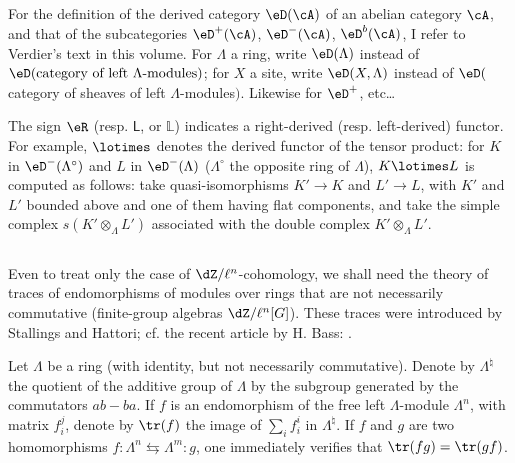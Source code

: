 \subsection{}\label{II:4-1}

For the definition of the derived category $\eD(\cA)$ of an abelian category
$\cA$, and that of the subcategories $\eD^+(\cA)$, $\eD^-(\cA)$,
$\eD^b(\cA)$, I refer to Verdier's text in this volume. For $\Lambda$ a ring,
write $\eD(\Lambda)$ instead of
$\eD(\text{category of left $\Lambda$-modules})$; for $X$ a site, write
$\eD(X,\Lambda)$ instead of
$\eD($category of sheaves of left $\Lambda$-modules$)$. Likewise for
$\eD^+$, etc\ldots

The sign $\eR$ (resp. $\mathsf{L}$, or $\mathbb{L}$) indicates a right-derived (resp.
left-derived) functor. For example, $\lotimes$ denotes the derived functor of
the tensor product: for $K$ in $\eD^-(\Lambda^\circ)$ and $L$ in
$\eD^-(\Lambda)$ ($\Lambda^\circ$ the opposite ring of $\Lambda$),
$K\lotimes L$ is computed as follows: take quasi-isomorphisms $K'\to K$ and
$L'\to L$, with $K'$ and $L'$ bounded above and one of them having flat
components, and take the simple complex $s(K'\otimes_\Lambda L')$ associated
with the double complex $K'\otimes_\Lambda L'$.






\subsection{}\label{II:4-2}

Even to treat only the case of $\dZ/\ell^n$-cohomology, we shall need the
theory of traces of endomorphisms of modules over rings that are not
necessarily commutative (finite-group algebras $\dZ/\ell^n[G]$). These
traces were introduced by Stallings and Hattori; cf. the recent article by H. Bass: .

Let $\Lambda$ be a ring (with identity, but not necessarily commutative).
Denote by $\Lambda^\natural$ the quotient of the additive group of $\Lambda$
by the subgroup generated by the commutators $a b-b a$. If $f$ is an
endomorphism of the free left $\Lambda$-module $\Lambda^n$, with matrix
$f_i^j$, denote by $\tr(f)$ the image of $\sum_i f_i^i$ in
$\Lambda^\natural$. If $f$ and $g$ are two homomorphisms
$f:\Lambda^n \leftrightarrows \Lambda^m : g$, one immediately verifies that
$\tr(f g) = \tr(g f)$.

